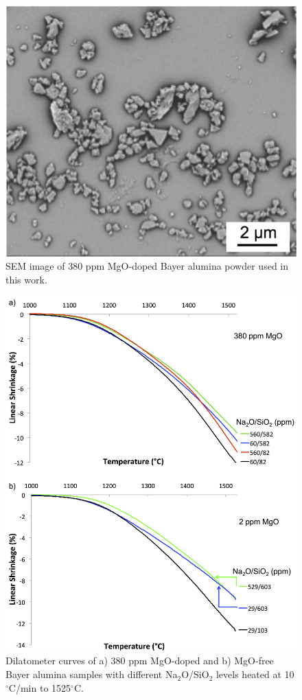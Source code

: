 \newpage
\begin{figure}[H]
	\centering
	\includegraphics{Chapter-3/Figures/Figure1.png}
	\caption{SEM image of 380 ppm MgO-doped Bayer alumina powder used in this work.}
	\label{Ch3-figure:Figure1}
\end{figure}

\newpage
\begin{figure}[H]
	\centering
	\includegraphics[width=\textwidth]{Chapter-3/Figures/Figure2.png}
	\caption{Dilatometer curves of a) 380 ppm MgO-doped and b) MgO-free Bayer alumina samples with different Na$_{2}$O/SiO$_{2}$ levels heated at 10$^{\circ}$C/min to 1525$^{\circ}$C.}
	\label{Ch3-figure:Figure2}
\end{figure}

